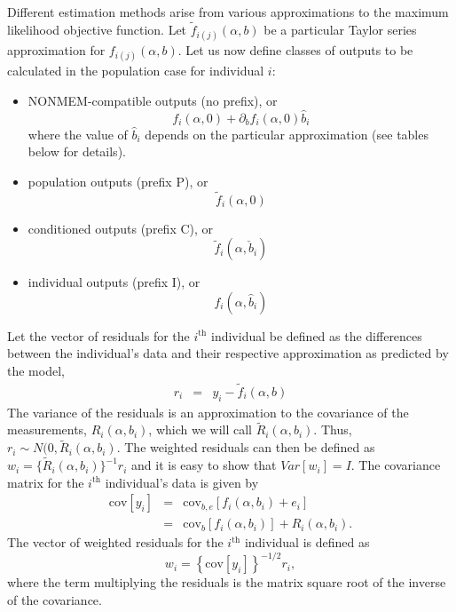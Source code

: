 \documentclass{article}
\begin{document}
Different estimation methods arise from various approximations to
the maximum likelihood objective function. Let $\tilde{f}_{i(j)}(\alpha, b)$
be a particular Taylor series approximation for $f_{i(j)}(\alpha, b)$.
Let us now define classes of outputs to be calculated in the population case
for individual $i$:
\begin{itemize}
  \item NONMEM-compatible outputs (no prefix), or
	\begin{equation}
	\label{noprefix}
	f_i(\alpha, 0) + \partial_b f_i(\alpha, 0)\hat{b}_i
	\end{equation}
where the value of $\hat{b}_i$ depends on the particular approximation
(see tables below for details).
  \item population outputs (prefix P), or 
	\begin{equation}\label{P}\tilde{f}_i(\alpha, 0)\end{equation}
  \item conditioned outputs (prefix C), or 
	\begin{equation}\label{C}\tilde{f}_i(\alpha, \check{b}_i)\end{equation}
  \item individual outputs (prefix I), or 
	\begin{equation}\label{I}f_i(\alpha, \hat{b}_i)\end{equation}
\end{itemize}

Let the vector of residuals for the $i^{\mbox{th}}$ individual be
defined as the differences between the individual's data and their 
respective approximation as predicted by the model,
  \begin{eqnarray}
    r_i & = & y_i - \tilde{f}_i(\alpha, b)
  \end{eqnarray}
The variance of the residuals is an approximation to the covariance 
of the measurements, $R_i(\alpha, b_i)$, which we will call 
$\tilde{R}_i(\alpha, b_i)$.
Thus, $r_i \sim N(0, \tilde{R}_i(\alpha, b_i)$. The weighted residuals
can then be defined as $w_i = \{\tilde{R}_i(\alpha, b_i)\}^{-1} r_i$
and it is easy to show that $Var[w_i] = I$.
The covariance matrix for the $i^{\mbox{th}}$ individual's data is
given by
  \begin{eqnarray}
    \mbox{cov}[y_i] & = & \mbox{cov}_{b,e}
          \left[ f_i(\alpha, b_i) + e_i \right] \nonumber \\
        & = & \mbox{cov}_{b} \left[ f_i(\alpha, b_i) \right]
                  + R_i(\alpha, b_i) .
  \end{eqnarray}
The vector of weighted residuals for the $i^{\mbox{th}}$ individual is
defined as 
  \begin{equation}
    w_i = \left\{ \mbox{cov}[y_i] \right\}^{-1/2} r_i,
  \end{equation}
where the term multiplying the residuals is the matrix square 
root of the inverse of the covariance.
\end{document}
